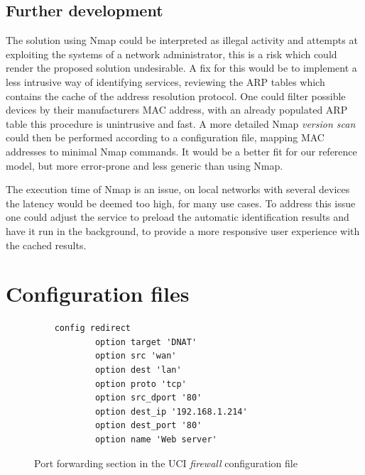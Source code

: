 \documentclass[g5paper,11pt]{kth-bcs}
\begin{document}
\newpage
\section{Further development}
The solution using Nmap could be interpreted as illegal activity and attempts at exploiting the systems of a network administrator, this is a risk which could render the proposed solution undesirable.
A fix for this would be to implement a less intrusive way of identifying services, reviewing the ARP tables which contains the cache of the address resolution protocol.
One could filter possible devices by their manufacturers MAC address, with an already populated ARP table this procedure is unintrusive and fast.
A more detailed Nmap \emph{version scan} could then be performed according to a configuration file, mapping MAC addresses to minimal Nmap commands.
It would be a better fit for our reference model, but more error-prone and less generic than using Nmap.

The execution time of Nmap is an issue, on local networks with several devices the latency would be deemed too high, for many use cases.
To address this issue one could adjust the service to preload the automatic identification results and have it run in the background, to provide a more responsive user experience with the cached results.

\newpage
\newpage
\appendix
\addappheadtotoc
\chapter{Configuration files}\label{appA}

   \begin{figure}[ht]
      \centering
      \begin{lstlisting}
    config redirect               
            option target 'DNAT' 
            option src 'wan'
            option dest 'lan'
            option proto 'tcp'
            option src_dport '80'
            option dest_ip '192.168.1.214'
            option dest_port '80' 
            option name 'Web server'
      \end{lstlisting}
      \caption{
         \small{
Port forwarding section in the UCI \emph{firewall} configuration file
         }
      }
      \label{fig:redirect_conf}
   \end{figure}
\end{document}
